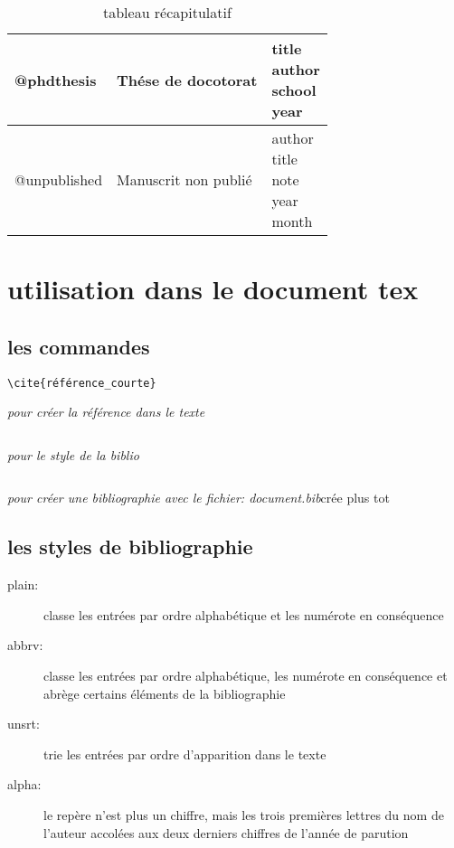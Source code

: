 \begin{table}
\begin{tabular}{|l|l|l|}
@phdthesis& Thése de docotorat&
\myminipage{ \vspace{0.5cm}
title\\
author\\
school\\
year \vspace{0.5cm}\\} \\\hline

@unpublished & Manuscrit non publié&
\myminipage{ \vspace{0.5cm}
author\\
title\\
note\\
year\\
month \vspace{0.5cm}\\}  \\\hline

\end{tabular}
	\caption{tableau récapitulatif}
	\label{tab:tableauRécapitulatif}
\end{table}

\chapter{utilisation dans le document tex}

\section{les commandes}

\begin{verbatim}\cite{référence_courte}\end{verbatim}
 \textit{pour créer la référence dans le texte}
\begin{verbatim}\end{verbatim} \textit{pour le style de la biblio}
 \begin{verbatim}\end{verbatim} \textit{pour créer une bibliographie avec le fichier:  document.bib}{\small crée plus tot}


\section{les styles de bibliographie}

\begin{description}
\item[plain: ] classe les entrées par ordre alphabétique et les numérote en conséquence
\item[abbrv: ] classe les entrées par ordre alphabétique, les numérote en conséquence et abrège certains éléments de la bibliographie
\item[unsrt: ] trie les entrées par ordre d'apparition dans le texte 
\item[alpha: ] le repère n'est plus un chiffre, mais les trois premières lettres du nom de l'auteur accolées aux deux derniers chiffres de l'année de parution
\end{description}
